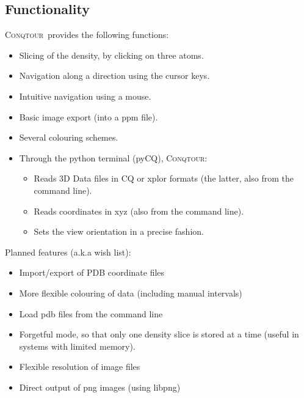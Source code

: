 \documentclass[a4paper,notitlepage,11pt]{article}
\def\Conqtour{\textsc{Conqtour}}
\begin{document}
\subsection{Functionality}
\label{sec:functionality}

\Conqtour\ provides the following functions:

\begin{itemize}
\item Slicing of the density, by clicking on three atoms.
\item Navigation along a direction using the cursor keys.
\item Intuitive navigation using a mouse.
\item Basic image export (into a ppm file).
\item Several colouring schemes.
\item Through the python terminal (pyCQ), \Conqtour:
  \begin{itemize}
  \item Reads 3D Data files in CQ or xplor formats (the latter, also from the command line).
  \item Reads coordinates in xyz (also from the command line).
  \item Sets the view orientation in a precise fashion.
  \end{itemize}
\end{itemize}

\noindent Planned features (a.k.a wish list):

\begin{itemize}
\item Import/export of PDB coordinate files
\item More flexible colouring of data (including manual intervals)
\item Load pdb files from the command line
\item Forgetful mode, so that only one density slice is stored at a time (useful in systems with limited memory).
\item Flexible resolution of image files
\item Direct output of png images (using libpng)
\end{itemize}

%
\end{document}
